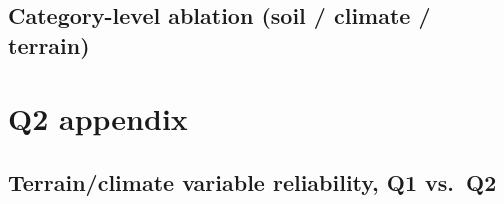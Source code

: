 \subsection{Category-level ablation (soil / climate / terrain)}
\label{app:category-ablation}

\section{Q2 appendix}
\label{app:results-q2}

\subsection{Terrain/climate variable reliability, Q1 vs.\ Q2}
\label{app:results-q2-reliability}

